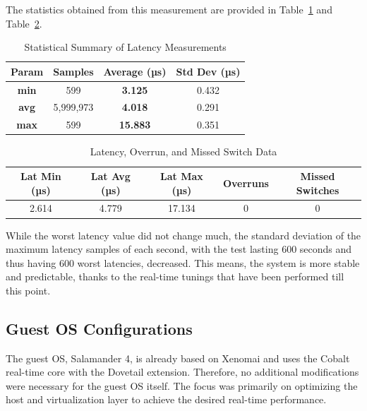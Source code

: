 \documentclass[MMR,Master,english]{twbook}
\begin{document}
\clearpage

\noindent The statistics obtained from this measurement are provided in Table~\ref{tab:latency_stats_virt_qemu} and Table~\ref{tab:latency_overrun_msw_new_virt_qemu}. 

\begin{table}[H]
	\centering
	\begin{tabular}{|c|c|c|c|}
	\hline
	\textbf{Param} & \textbf{Samples} & \textbf{Average (µs)} & \textbf{Std Dev (µs)} \\ \hline
	\textbf{min} & 599 & \textbf{3.125} & 0.432 \\ \hline
	\textbf{avg} & 5,999,973 & \textbf{4.018} & 0.291 \\ \hline
	\textbf{max} & 599 & \textbf{15.883} & 0.351 \\ \hline
	\end{tabular}
	\caption{Statistical Summary of Latency Measurements}
	\label{tab:latency_stats_virt_qemu}
	\end{table}
	
	\begin{table}[H]
	\centering
	\begin{tabular}{|c|c|c|c|c|}
	\hline
	\textbf{Lat Min (µs)} & \textbf{Lat Avg (µs)} & \textbf{Lat Max (µs)} & \textbf{Overruns} & \textbf{Missed Switches} \\ \hline
	2.614 & 4.779 & 17.134 & 0 & 0 \\ \hline
	\end{tabular}
	\caption{Latency, Overrun, and Missed Switch Data}
	\label{tab:latency_overrun_msw_new_virt_qemu}
	\end{table}

	\noindent While the worst latency value did not change much, the standard deviation of the maximum latency samples of each second, with the test lasting 600 seconds and thus having 600 worst latencies, decreased. This means, the system is more stable and predictable, thanks to the real-time tunings that have been performed till this point. 

\subsection{Guest OS Configurations}\label{subsec:guest_configurations}
The guest OS, Salamander 4, is already based on Xenomai and uses the Cobalt real-time core with the Dovetail extension. Therefore, no additional modifications were necessary for the guest OS itself. The focus was primarily on optimizing the host and virtualization layer to achieve the desired real-time performance.
\end{document}
